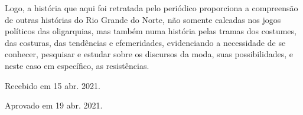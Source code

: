 \begin{refsection}
    Logo, a história que aqui foi retratada pelo periódico proporciona a compreensão de outras histórias do Rio Grande do Norte, não somente calcadas nos jogos políticos das oligarquias, mas também numa história pelas tramas dos costumes, das costuras, das tendências e efemeridades, evidenciando a necessidade de se conhecer, pesquisar e estudar sobre os discursos da moda, suas possibilidades, e neste caso em específico, as resistências.

    \printbibliography[heading=subbibliography,notcategory=fullcited]

    \hfill Recebido em 15 abr. 2021.

    \hfill Aprovado em 19 abr. 2021.

    \label{chap:vencidonewlookend}

\end{refsection}

